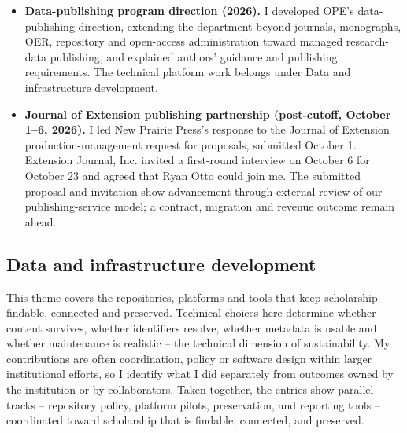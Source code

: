 \begin{itemize}
\item \textbf{Data-publishing program direction (2026).} I developed OPE's data-publishing direction, extending the department beyond journals, monographs, OER, repository and open-access administration toward managed research-data publishing, and explained authors' guidance and publishing requirements. The technical platform work belongs under Data and infrastructure development.
\item \textbf{Journal of Extension publishing partnership (post-cutoff, October 1--6, 2026).}\label{update-joe} I led New Prairie Press's response to the Journal of Extension production-management request for proposals, submitted October 1. Extension Journal, Inc. invited a first-round interview on October 6 for October 23 and agreed that Ryan Otto could join me. The submitted proposal and invitation show advancement through external review of our publishing-service model; a contract, migration and revenue outcome remain ahead.
\end{itemize}

\subsection{Data and infrastructure development}
This theme covers the repositories, platforms and tools that keep scholarship findable, connected and preserved. Technical choices here determine whether content survives, whether identifiers resolve, whether metadata is usable and whether maintenance is realistic -- the technical dimension of sustainability. My contributions are often coordination, policy or software design within larger institutional efforts, so I identify what I did separately from outcomes owned by the institution or by collaborators. Taken together, the entries show parallel tracks -- repository policy, platform pilots, preservation, and reporting tools -- coordinated toward scholarship that is findable, connected, and preserved.

